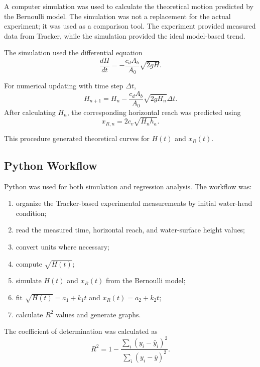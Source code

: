 \documentclass[11pt,letterpaper]{article}
\begin{document}
A computer simulation was used to calculate the theoretical motion predicted by the Bernoulli model. The simulation was not a replacement for the actual experiment; it was used as a comparison tool. The experiment provided measured data from Tracker, while the simulation provided the ideal model-based trend.

The simulation used the differential equation
\begin{equation}
    \frac{dH}{dt}
    =
    -\frac{c_dA_b}{A_0}\sqrt{2gH}.
    \label{eq:simulation_ode}
\end{equation}

For numerical updating with time step $\Delta t$,
\begin{equation}
    H_{n+1}
    =
    H_n
    -
    \frac{c_dA_b}{A_0}\sqrt{2gH_n}\Delta t.
    \label{eq:euler_update}
\end{equation}
After calculating $H_n$, the corresponding horizontal reach was predicted using
\begin{equation}
    x_{R,n}=2c_v\sqrt{H_nh_a}.
    \label{eq:sim_reach}
\end{equation}

This procedure generated theoretical curves for $H(t)$ and $x_R(t)$.

\subsection{Python Workflow}

Python was used for both simulation and regression analysis. The workflow was:
\begin{enumerate}[itemsep=0.1em]
    \item organize the Tracker-based experimental measurements by initial water-head condition;
    \item read the measured time, horizontal reach, and water-surface height values;
    \item convert units where necessary;
    \item compute $\sqrt{H(t)}$;
    \item simulate $H(t)$ and $x_R(t)$ from the Bernoulli model;
    \item fit $\sqrt{H(t)}=a_1+k_1t$ and $x_R(t)=a_2+k_2t$;
    \item calculate $R^2$ values and generate graphs.
\end{enumerate}
The coefficient of determination was calculated as
\begin{equation}
    R^2=1-\frac{\sum_i(y_i-\hat{y}_i)^2}{\sum_i(y_i-\bar{y})^2}.
\end{equation}
\end{document}
